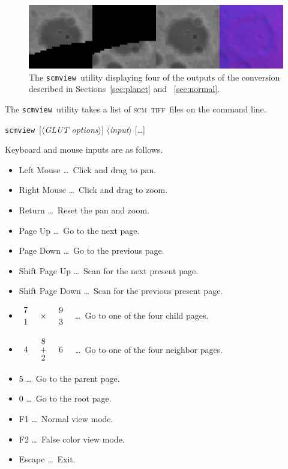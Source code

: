 \documentclass[oneside,10pt]{memoir}
\newcommand{\scm}     {\textsc{scm}}
\newcommand{\tiff}    {\textsc{tiff}}
\newcommand{\scmview} {\texttt{scmview}}
\newcommand{\X}[1]{\smash{#1}\phantom{o}}
\newcommand{\inangles}[1]{$\langle$#1$\rangle$}
\newenvironment{optionlist}
  {\setlength{\leftmargini}{1in}\begin{itemize}}{\end{itemize}}
\begin{document}
\begin{Spacing}{1.1}
\begin{figure}
  \centering
  \includegraphics[width=\textwidth]{fig/scmview.png}
  \caption{The \scmview\ utility displaying four of the outputs of the conversion described in Sections~\ref{sec:planet} and ~\ref{sec:normal}.}
  \label{fig:scmview}
\end{figure}

The \scmview\ utility takes a list of \scm\ \tiff\ files on the command line.

\bigskip\noindent\scmview\ [\inangles{\textit{GLUT options}}] \inangles{\textit{input}} [\ldots]

\bigskip Keyboard and mouse inputs are as follows.

\begin{optionlist}
\item[Left Mouse] \ldots\ Click and drag to pan.
\item[Right Mouse] \ldots\ Click and drag to zoom.
\item[Return] \ldots\ Reset the pan and zoom.
\item[Page Up] \ldots\ Go to the next page.
\item[Page Down] \ldots\ Go to the previous page.
\item[Shift Page Up] \ldots\ Scan for the next present page.
\item[Shift Page Down] \ldots\ Scan for the previous present page.
\item[{\setlength{\arraycolsep}{0pt}
$\begin{array}{ccc}
\X{7} & \X{ }      & \X{9} \\[-5pt]
\X{ } & \X{\times} & \X{ } \\[-5pt]
\X{1} & \X{ }      & \X{3} \\
\end{array}$
}] \ldots\ Go to one of the four child pages.
\item[{\setlength{\arraycolsep}{0pt}
$\begin{array}{ccc}
\X{ } & \X{8} & \X{ } \\[-2pt]
\X{4} & \X{+} & \X{6} \\[-2pt]
\X{ } & \X{2} & \X{ } \\
\end{array}$
}] \ldots\ Go to one of the four neighbor pages.
\item[5] \dots\ Go to the parent page.
\item[0] \dots\ Go to the root page.
\item[F1] \ldots\ Normal view mode.
\item[F2] \ldots\ False color view mode.
\item[Escape] \ldots\ Exit.
\end{optionlist}


\end{Spacing}
\end{document}
